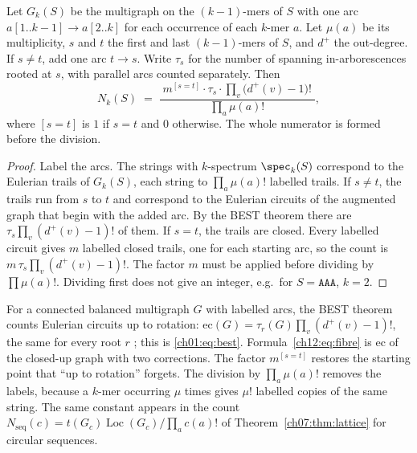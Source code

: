 \begin{theorem}\label{ch12:thm:fibre}
Let $G_k(S)$ be the multigraph on the $(k-1)$-mers of $S$ with one arc $a[1..k-1]\to a[2..k]$ for each
occurrence of each $k$-mer $a$. Let $\mu(a)$ be its multiplicity, $s$ and $t$ the first and last
$(k-1)$-mers of $S$, and $d^{+}$ the out-degree. If $s\ne t$, add one arc $t\to s$. Write $\tau_s$ for
the number of spanning in-arborescences rooted at $s$, with parallel arcs counted separately. Then
\begin{equation}\label{ch12:eq:fibre}
N_k(S)\;=\;\frac{\;m^{[s=t]}\cdot\tau_s\cdot\prod_v\bigl(d^{+}(v)-1\bigr)!\;}{\prod_a\mu(a)!},
\end{equation}
where $[s=t]$ is $1$ if $s=t$ and $0$ otherwise. The whole numerator is formed before the division.
\end{theorem}

\begin{proof}
Label the arcs. The strings with $k$-spectrum $\spec_k(S)$ correspond to the Eulerian trails of
$G_k(S)$, each string to $\prod_a\mu(a)!$ labelled trails. If $s\ne t$, the trails run from $s$ to
$t$ and correspond to the Eulerian circuits of the augmented graph that begin with the added arc. By the
BEST theorem \cite{BEST} there are $\tau_s\prod_v(d^{+}(v)-1)!$ of them. If $s=t$, the trails are closed.
Every labelled circuit gives $m$ labelled closed trails, one for each starting arc, so the count is
$m\,\tau_s\prod_v(d^{+}(v)-1)!$. The factor $m$ must be applied before dividing by $\prod\mu(a)!$.
Dividing first does not give an integer, e.g.\ for $S=\mathtt{AAA}$, $k=2$.
\end{proof}

\begin{remark}\label{ch12:rem:best}
For a connected balanced multigraph $G$ with labelled arcs, the BEST theorem counts Eulerian circuits
up to rotation: $\mathrm{ec}(G)=\tau_r(G)\prod_v(d^{+}(v)-1)!$, the same for every root $r$
\cite{BEST}; this is \eqref{ch01:eq:best}. Formula~\eqref{ch12:eq:fibre} is $\mathrm{ec}$ of the closed-up graph with two corrections. The
factor $m^{[s=t]}$ restores the starting point that ``up to rotation'' forgets. The division by
$\prod_a\mu(a)!$ removes the labels, because a $k$-mer occurring $\mu$ times gives $\mu!$ labelled
copies of the same string. The same constant appears in the count
$N_{\mathrm{seq}}(c)=t(G_c)\operatorname{Loc}(G_c)/\prod_ac(a)!$ of Theorem~\ref{ch07:thm:lattice} for
circular sequences.
\end{remark}

